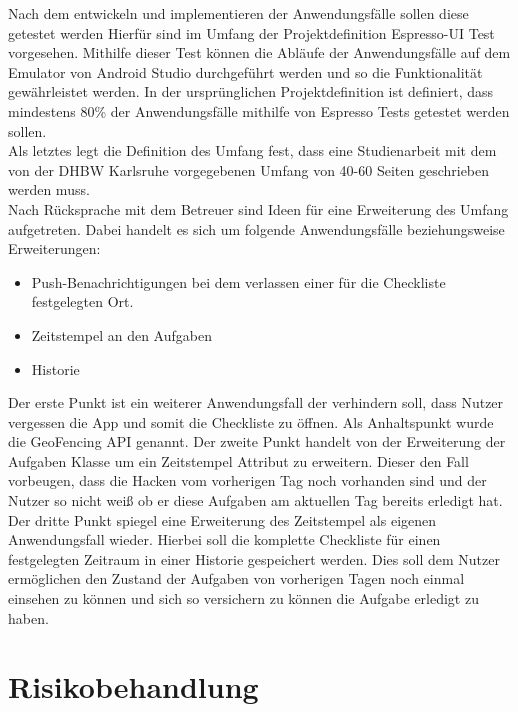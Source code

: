 Nach dem entwickeln und implementieren der Anwendungsfälle sollen diese getestet werden Hierfür sind im Umfang der Projektdefinition Espresso-UI Test vorgesehen. Mithilfe dieser Test können die Abläufe der Anwendungsfälle auf dem Emulator von Android Studio durchgeführt werden und so die Funktionalität gewährleistet werden. In der ursprünglichen Projektdefinition ist definiert, dass mindestens 80\% der Anwendungsfälle mithilfe von Espresso Tests getestet werden sollen.\\
Als letztes legt die Definition des Umfang fest, dass eine Studienarbeit mit dem von der \ac{DHBW} Karlsruhe vorgegebenen Umfang von 40-60 Seiten geschrieben werden muss.\\

Nach Rücksprache mit dem Betreuer sind Ideen für eine Erweiterung des Umfang aufgetreten. Dabei handelt es sich um folgende Anwendungsfälle beziehungsweise Erweiterungen:

\begin{itemize}
	\item Push-Benachrichtigungen bei dem verlassen einer für die Checkliste festgelegten Ort.
	\item Zeitstempel an den Aufgaben
	\item Historie
\end{itemize}

Der erste Punkt ist ein weiterer Anwendungsfall der verhindern soll, dass Nutzer vergessen die App und somit die Checkliste zu öffnen. Als Anhaltspunkt wurde die GeoFencing API genannt. Der zweite Punkt handelt von der Erweiterung der Aufgaben Klasse um ein Zeitstempel Attribut zu erweitern. Dieser den Fall vorbeugen, dass die Hacken vom vorherigen Tag noch vorhanden sind und der Nutzer so nicht weiß ob er diese Aufgaben am aktuellen Tag bereits erledigt hat. Der dritte Punkt spiegel eine Erweiterung des Zeitstempel als eigenen Anwendungsfall wieder. Hierbei soll die komplette Checkliste für einen festgelegten Zeitraum in einer Historie gespeichert werden. Dies soll dem Nutzer ermöglichen den Zustand der Aufgaben von vorherigen Tagen noch einmal einsehen zu können und sich so versichern zu können die Aufgabe erledigt zu haben.

\section{Risikobehandlung}\label{sec:risiko}

